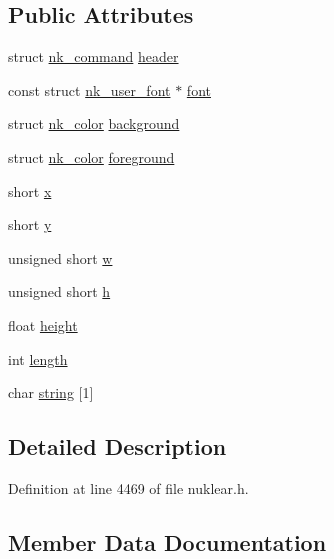 \subsection*{Public Attributes}
\begin{DoxyCompactItemize}
\item 
struct \mbox{\hyperlink{structnk__command}{nk\+\_\+command}} \mbox{\hyperlink{structnk__command__text_a5a7a41a2afb06824c9b1573d20573fca}{header}}
\item 
const struct \mbox{\hyperlink{structnk__user__font}{nk\+\_\+user\+\_\+font}} $\ast$ \mbox{\hyperlink{structnk__command__text_a57e049a57f88d08355b6aa929d8e960c}{font}}
\item 
struct \mbox{\hyperlink{structnk__color}{nk\+\_\+color}} \mbox{\hyperlink{structnk__command__text_a3a1225818bc3f2174b836d797979a55b}{background}}
\item 
struct \mbox{\hyperlink{structnk__color}{nk\+\_\+color}} \mbox{\hyperlink{structnk__command__text_a89f088f305fa55471fe85e74d6d7e69c}{foreground}}
\item 
short \mbox{\hyperlink{structnk__command__text_aabc9267e7890ddcdd8caefa34cf0e220}{x}}
\item 
short \mbox{\hyperlink{structnk__command__text_ace809f5ab5b1aadd3a97284fb5210a50}{y}}
\item 
unsigned short \mbox{\hyperlink{structnk__command__text_aeb1534c55f5f583788aa6baf8e89da0e}{w}}
\item 
unsigned short \mbox{\hyperlink{structnk__command__text_ad14a9b2dbadcaee4f9d5de6846e09007}{h}}
\item 
float \mbox{\hyperlink{structnk__command__text_ac4c5a4f26388eaee498ef221b87fdeff}{height}}
\item 
int \mbox{\hyperlink{structnk__command__text_a61808e6a805e90be52ec3b412446cd9d}{length}}
\item 
char \mbox{\hyperlink{structnk__command__text_a15f58b2e33dd173cf5b6b9803e1617bb}{string}} \mbox{[}1\mbox{]}
\end{DoxyCompactItemize}


\subsection{Detailed Description}


Definition at line 4469 of file nuklear.\+h.



\subsection{Member Data Documentation}
\mbox{\label{structnk__command__text_a3a1225818bc3f2174b836d797979a55b}} 
